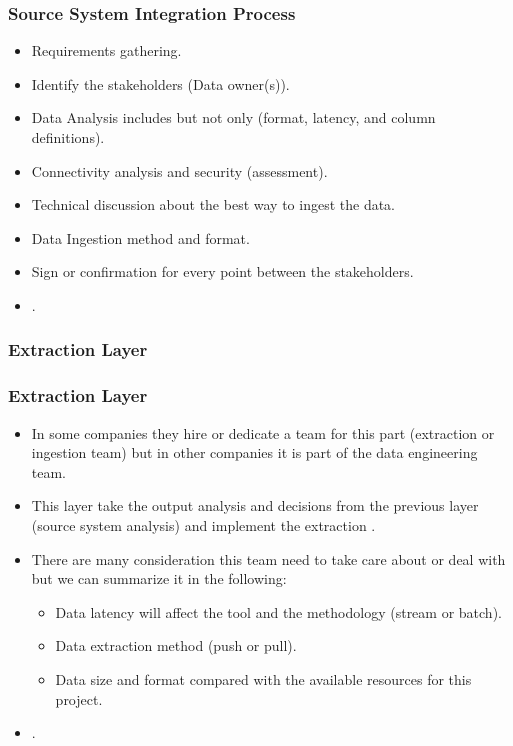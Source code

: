 \begin{frame}
\frametitle{Source System Integration Process}
\begin{itemize}[<+->]
	\item  Requirements gathering. %
	\item  Identify the stakeholders (Data owner(s)).
	\item  Data Analysis includes but not only (format, latency, and column definitions).
	\item  Connectivity analysis and security (assessment).
	\item  Technical discussion about the best way to ingest the data.
	\item  Data Ingestion method and format.
	\item  Sign or confirmation for every point between the stakeholders.
	\item  {}.
\end{itemize}

\end{frame}



\subsubsection{Extraction Layer}

\begin{frame}
\frametitle{Extraction Layer}
\begin{itemize}[<+->]
	\item In some companies they hire or dedicate a team for this part (extraction or ingestion team) but in other companies it is part of the data engineering team.
	\item This layer take the output analysis and decisions from the previous layer (source system analysis) and implement the extraction .
	\item There are many consideration this team need to take care about or deal with but we can summarize it in the following:
		\begin{itemize}			
			\item  Data latency will affect the tool and the methodology (stream or batch).
			\item  Data extraction method (push or pull).
			\item  Data size and format compared with the available resources for this project.
		\end{itemize}
	\item {}.

\end{itemize}

\end{frame}

